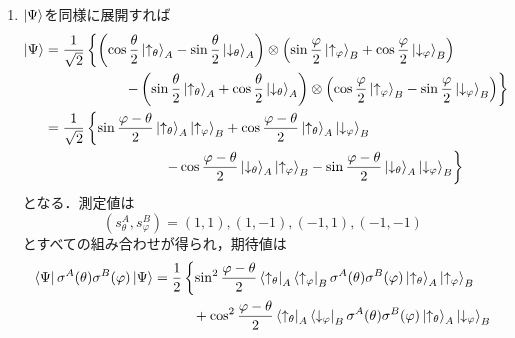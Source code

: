 \documentclass[a4paper,pdflatex,ja=standard]{bxjsarticle}
\begin{document}
\begin{enumerate}
  \item 
  $\ket{\Psi}$を同様に展開すれば
  \begin{align}
    \ket{\Psi}
    &=
    \frac{1}{\sqrt{2}}
    \left\{ 
    \left( \cos\frac{\theta}{2}
    \ket{\uparrow_{\theta}}_{A}
    -
    \sin\frac{\theta}{2}
    \ket{\downarrow_{\theta}}_{A}\right)\otimes
    \left( \sin\frac{\varphi}{2}
    \ket{\uparrow_{\varphi}}_{B}
    +
    \cos\frac{\varphi}{2}
    \ket{\downarrow_{\varphi}}_{B} \right)
    \right.
    \nonumber
    \\
    &\hspace*{2cm}\left.
    -
    \left( \sin\frac{\theta}{2}
    \ket{\uparrow_{\theta}}_{A}
    +
    \cos\frac{\theta}{2}
    \ket{\downarrow_{\theta}}_{A} \right)\otimes
    \left( \cos\frac{\varphi}{2}
    \ket{\uparrow_{\varphi}}_{B}
    -
    \sin\frac{\varphi}{2}
    \ket{\downarrow_{\varphi}}_{B} \right)
    \right\}
    \nonumber
    \\
    &=
    \frac{1}{\sqrt{2}}
    \left\{ 
    \sin\frac{\varphi-\theta}{2}\ket{\uparrow_{\theta}}_{A}\ket{\uparrow_{\varphi}}_{B}
    +
    \cos\frac{\varphi-\theta}{2}\ket{\uparrow_{\theta}}_{A}\ket{\downarrow_{\varphi}}_{B}
    \right.
    \nonumber
    \\
    &\hspace*{3cm}\left.
    -
    \cos\frac{\varphi-\theta}{2}\ket{\downarrow_{\theta}}_{A}\ket{\uparrow_{\varphi}}_{B}
    -
    \sin\frac{\varphi-\theta}{2}
    \ket{\downarrow_{\theta}}_{A}\ket{\downarrow_{\varphi}}_{B}
    \right\}
  \end{align}
  となる．測定値は
  \begin{equation}
    (s_{\theta}^{A},s_{\varphi}^{B})
    =
    (1,1),(1,-1),(-1,1),(-1,-1)
  \end{equation}
  とすべての組み合わせが得られ，期待値は
  \begin{align}
    \bra{\Psi}\sigma^{A}(\theta)\sigma^{B}(\varphi)\ket{\Psi}
    &=
    \frac{1}{2}\left\{ 
    \sin^2\frac{\varphi-\theta}{2}\bra{\uparrow_{\theta}}_{A}\bra{\uparrow_{\varphi}}_{B}\sigma^{A}(\theta)\sigma^{B}(\varphi)\ket{\uparrow_{\theta}}_{A}\ket{\uparrow_{\varphi}}_{B}
    \right.
    \nonumber
    \\
    &\hspace*{1cm}
    +
    \cos^2\frac{\varphi-\theta}{2}\bra{\uparrow_{\theta}}_{A}\bra{\downarrow_{\varphi}}_{B}\sigma^{A}(\theta)\sigma^{B}(\varphi)\ket{\uparrow_{\theta}}_{A}\ket{\downarrow_{\varphi}}_{B}
    \nonumber
    \\
    &\hspace*{1cm}

\end{align}
\end{enumerate}
\end{document}
